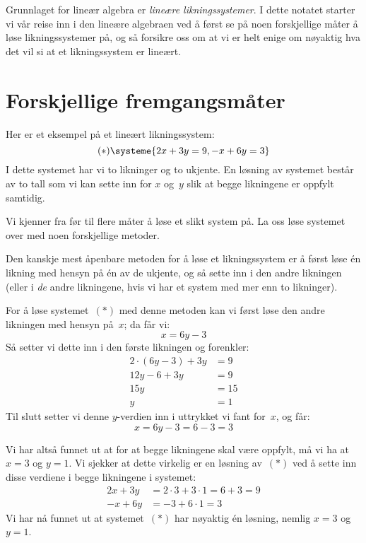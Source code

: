 


Grunnlaget for lineær algebra er \emph{lineære liknings\-systemer}.  I
dette notatet starter vi vår reise inn i den lineære algebraen ved å
først se på noen forskjellige måter å løse likningssystemer på, og så
forsikre oss om at vi er helt enige om nøyaktig hva det vil si at et
likningssystem er lineært.

\section*{Forskjellige fremgangsmåter}

Her er et eksempel på et lineært likningssystem:
\[
(\ast)
\systeme{
2x + 3y = 9,
-x + 6y = 3
}
\]
I dette systemet har vi to likninger og to ukjente.
En løsning av systemet består av to tall som vi kan sette inn
for $x$ og~$y$ slik at begge likningene er oppfylt samtidig.

Vi kjenner fra før til flere måter å løse et slikt system på.  La oss
løse systemet over med noen forskjellige metoder.

\begin{ex}
Den kanskje mest åpenbare metoden for å løse et likningssystem er å
først løse én likning med hensyn på én av de ukjente, og så sette inn
i den andre likningen (eller i \emph{de} andre likningene, hvis vi har
et system med mer enn to likninger).

For å løse systemet~$(\ast)$ med denne metoden kan vi først løse den
andre likningen med hensyn på~$x$; da får vi:
\[
x = 6y - 3
\]
Så setter vi dette inn i den første likningen og forenkler:
\begin{align*}
2 \cdot (6y - 3) + 3y &= 9 \\
12y - 6 + 3y &= 9 \\
15y &= 15 \\
y &= 1
\end{align*}
Til slutt setter vi denne $y$-verdien inn i uttrykket vi fant for~$x$,
og får:
\[
x = 6y - 3 = 6 - 3 = 3
\]

Vi har altså funnet ut at for at begge likningene skal være oppfylt,
må vi ha at $x = 3$ og $y = 1$.  Vi sjekker at dette virkelig er en
løsning av~$(\ast)$ ved å sette inn disse verdiene i begge likningene
i systemet:
\begin{align*}
2x + 3y &= 2 \cdot 3 + 3 \cdot 1 = 6 + 3 = 9 \\
-x + 6y &= -3 + 6 \cdot 1 = 3
\end{align*}
Vi har nå funnet ut at systemet~$(\ast)$ har nøyaktig én løsning,
nemlig $x = 3$ og $y = 1$.
\end{ex}

